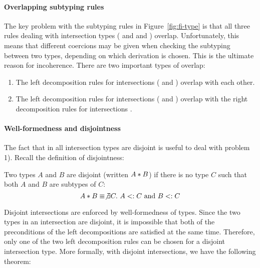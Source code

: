 \paragraph{Overlapping subtyping rules} The key problem with the
subtyping rules in Figure~\ref{fig:fi-type} is that all three rules dealing
with intersection types ( and
 and ) overlap.
Unfortunately, this means that different coercions may be given when checking
the subtyping between two types, depending on which derivation is chosen. This
is the ultimate reason for incoherence. There are two important types of
overlap:

\begin{enumerate}

\item The left decomposition rules for intersections (
and ) overlap with each other.

\item The left decomposition rules for intersections (
and ) overlap with the right decomposition rules for
intersections .

\end{enumerate}

\paragraph{Well-formedness and disjointness} 
The fact that in \name all intersection types are disjoint is useful to deal
with problem 1). Recall the definition of disjointness:

\begin{definition}\label{def:simple_dis}
  Two types $A$ and $B$ are disjoint
  (written $A * B$) if there is no type $C$ such that both $A$ and $B$ are
  subtypes of $C$:
  \[A * B \equiv \not\exists C.~A <: C~\text{and}~B <: C\]
\end{definition}

Disjoint intersections are enforced by well-formedness of types.
Since the two types in an intersection are disjoint, it is impossible
that both of the preconditions of the left decompositions are
satisfied at the same time. Therefore, only one of the two left
decomposition rules can be chosen for a disjoint intersection
type. More formally, with disjoint intersections, we have the
following theorem:

